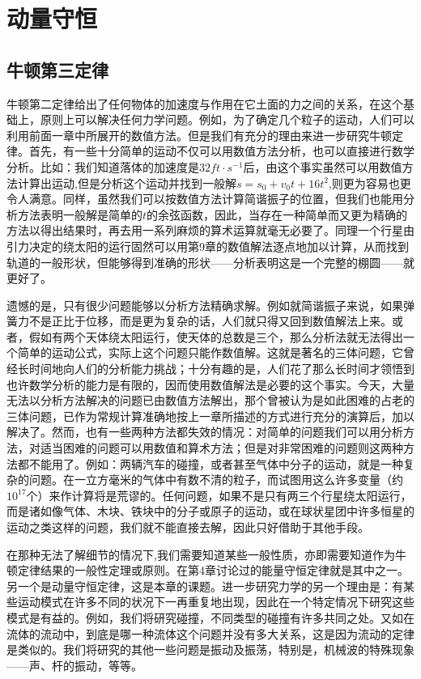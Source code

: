 \chapter{动量守恒}

\section{牛顿第三定律}

牛顿第二定律给出了任何物体的加速度与作用在它土面的力之间的关系，在这个基础上，原则上可以解决任何力学问题。例如，为了确定几个粒子的运动，人们可以利用前面一章中所展开的数值方法。但是我们有充分的理由来进一步研究牛顿定律。首先，有一些十分简单的运动不仅可以用数值方法分析，也可以直接进行数学分析。比如：我们知道落体的加速度是$32ft \cdot s^{-1}$后，由这个事实虽然可以用数值方法计算出运动,但是分析这个运动并找到一般解$s=s_0+v_0t+16t^2$,则更为容易也更令人满意。同样，虽然我们可以按数值方法计算简谐振子的位置，但我们也能用分析方法表明一般解是简单的$t$的余弦函数，因此，当存在一种简单而又更为精确的方法以得出结果时，再去用一系列麻烦的算术运算就毫无必要了。同理一个行星由引力决定的绕太阳的运行固然可以用第9章的数值解法逐点地加以计算，从而找到轨道的一般形状，但能够得到准确的形状——分析表明这是一个完整的棚圆——就更好了。

遗憾的是，只有很少问题能够以分析方法精确求解。例如就简谐振子来说，如果弹簧力不是正比于位移，而是更为复杂的话，人们就只得又回到数值解法上来。或者，假如有两个天体绕太阳运行，使天体的总数是三个，那么分析法就无法得出一个简单的运动公式，实际上这个问题只能作数值解。这就是著名的三体问题，它曾经长时间地向人们的分析能力挑战；十分有趣的是，人们花了那么长时间才领悟到也许数学分析的能力是有限的，因而使用数值解法是必要的这个事实。今天，大量无法以分析方法解决的问题已由数值方法解出，那个曾被认为是如此困难的占老的三体问题，已作为常规计算准确地按上一章所描述的方式进行充分的演算后，加以解决了。然而，也有一些两种方法都失效的情况：对简单的问题我们可以用分析方法，对适当困难的问题可以用数值和算术方法；但是对非常困难的问题则这两种方法都不能用了。例如：两辆汽车的碰撞，或者甚至气体中分子的运动，就是一种复杂的问题。在一立方毫米的气体中有数不清的粒子，而试图用这么许多变量（约$10^{17}$个）来作计算将是荒谬的。任何问题，如果不是只有两三个行星绕太阳运行，而是诸如像气体、木块、铁块中的分子或原子的运动，或在球状星团中许多恒星的运动之类这样的问题，我们就不能直接去解，因此只好借助于其他手段。

在那种无法了解细节的情况下,我们需要知道某些一般性质，亦即需要知道作为牛顿定律结果的一般性定理或原则。在第4章讨论过的能量守恒定律就是其中之一。另一个是动量守恒定律，这是本章的课题。进一步研究力学的另一个理由是：有某些运动模式在许多不同的状况下一再重复地出现，因此在一个特定情况下研究这些模式是有益的。例如，我们将研究碰撞，不同类型的碰撞有许多共同之处。又如在流体的流动中，到底是哪一种流体这个问题并没有多大关系，这是因为流动的定律是类似的。我们将研究的其他一些问题是振动及振荡，特别是，机械波的特殊现象——声、杆的振动，等等。

